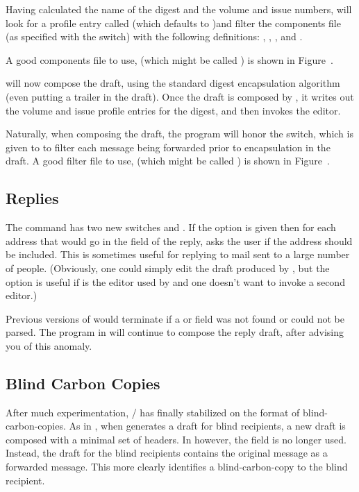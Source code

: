 Having calculated the name of the digest and the volume and issue numbers,
 will look for a profile entry called 
(which defaults to )and filter the components file
(as specified with the  switch)
with the following definitions:
, , , and .

A good components file to use, (which might be called ) is
shown in Figure~\digestcomps.

 will now compose the draft,
using the standard digest encapsulation algorithm
(even putting a  trailer in the draft).
Once the draft is composed by ,
it writes out the volume and issue profile entries for the digest,
and then invokes the editor.

Naturally, when composing the draft,
the  program will honor the\hbreak
{} switch,
which is given to  to filter each message being forwarded prior to
encapsulation in the draft.
A good filter file to use, (which might be called )
is shown in Figure~\mhldigest.

\subsection{Replies}
The  command has two new switches  and
.
If the  option is given then for each address that would go in
the  field of the reply,
 asks the user if the address should be included.
This is sometimes useful for replying to mail sent to a large number of people.
(Obviously, one could simply edit the draft produced by ,
but the  option is useful if  is the editor used
by  and one doesn't want to invoke a second editor.)

Previous versions of  would terminate if a  or
 field was not found or could not be parsed.
The  program in  will continue to compose the reply draft,
after advising you of this anomaly.

\subsection{Blind Carbon Copies}
After much experimentation, \MH/ has finally stabilized on the format of
blind-carbon-copies.
As in , when  generates a draft for blind recipients,
a new draft is composed with a minimal set of headers.
In  however, the  field is no longer used.
Instead, the draft for the blind recipients contains the original message as a
forwarded message.
This more clearly identifies a blind-carbon-copy to the blind recipient.


